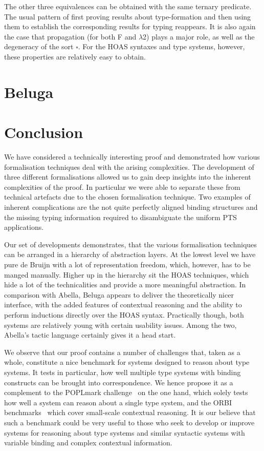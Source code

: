 \documentclass[a4paper,UKenglish]{lipics-v2016}
\newcommand{\SysL}{$\lambda$2\xspace}
\newcommand{\Typ}{\ensuremath{\square}}
\theoremstyle{plain}
\begin{document}
The other three equivalences can be obtained with the same ternary predicate.
The usual pattern of first proving results about type-formation and then using them to establish the corresponding results for typing reappears.
It is also again the case that propagation (for both F and \SysL) plays a major role, as well as the degeneracy of the sort $\Typ$.
For the HOAS syntaxes and type systems, however, these properties are relatively easy to obtain.

\section{Beluga}
\label{sec:beluga}


\section{Conclusion}
\label{sec:conclusion}

We have considered a technically interesting proof and demonstrated how various formalisation techniques deal with the arising complexities.
The development of three different formalisations allowed us to gain deep insights into the inherent complexities of the proof.
In particular we were able to separate these from technical artefacts due to the chosen formalisation technique.
Two examples of inherent complications are the not quite perfectly aligned binding structures and the missing typing information required to disambiguate the uniform PTS applications.

Our set of developments demonstrates, that the various formalisation techniques can be arranged in a hierarchy of abstraction layers.
At the lowest level we have pure de Bruijn with a lot of representation freedom, which, however, has to be manged manually.
Higher up in the hierarchy sit the HOAS techniques, which hide a lot of the technicalities and provide a more meaningful abstraction.
In comparison with Abella, Beluga appears to deliver the theoretically nicer interface, with the added features of contextual reasoning and the ability to perform inductions directly over the HOAS syntax.
Practically though, both systems are relatively young with certain usability issues.
Among the two, Abella's tactic language certainly gives it a head start.

We observe that our proof contains a number of challenges that, taken as a whole, constitute a nice benchmark for systems designed to reason about type systems.
It tests in particular, how well multiple type systems with binding constructs can be brought into correspondence.
We hence propose it as a complement to the POPLmark challenge~\cite{poplmark} on the one hand, which solely tests how well a system can reason about a single type system, and the ORBI benchmarks~\cite{Felty:ITP10,Felty:orbi-survey} which cover small-scale contextual reasoning.
It is our believe that such a benchmark could be very useful to those who seek to develop or improve systems for reasoning about type systems and similar syntactic systems with variable binding and complex contextual information.
\end{document}
